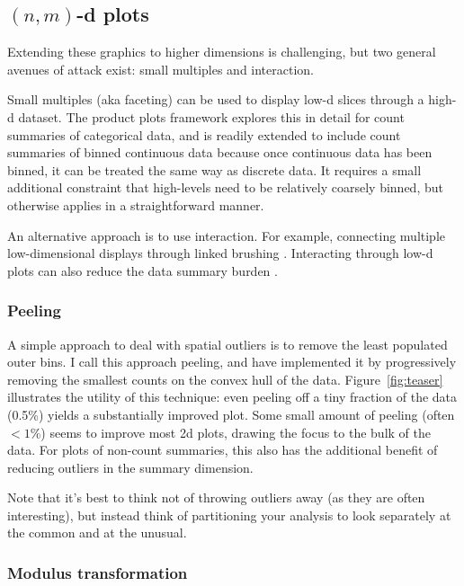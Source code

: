 \documentclass[journal]{vgtc}                %
\begin{document}
\subsection{\texorpdfstring{$(n, m)$}{(n, m)}-d plots}
\label{sub:nd-plots}

Extending these graphics to higher dimensions is challenging, but two general avenues of attack exist: small multiples and interaction.

Small multiples (aka faceting) can be used to display low-d slices through a high-d dataset. The product plots \citep{me:prodplots} framework explores this in detail for count summaries of categorical data, and is readily extended to include count summaries of binned continuous data because once continuous data has been binned, it can be treated the same way as discrete data. It requires a small additional constraint that high-levels need to be relatively coarsely binned, but otherwise applies in a straightforward manner.

An alternative approach is to use interaction. For example, connecting multiple low-dimensional displays through linked brushing \citep{liu:2013,swayne:2003}.  Interacting through low-d plots can also reduce the data summary burden \citep{heer:2012}.

\subsubsection{Peeling}
\label{sub:peeling}

A simple approach to deal with spatial outliers is to remove the least populated outer bins. I call this approach peeling, and have implemented it by progressively removing the smallest counts on the convex hull of the data. Figure~\ref{fig:teaser} illustrates the utility of this technique: even peeling off a tiny fraction of the data (0.5\%) yields a substantially improved plot. Some small amount of peeling (often $< 1\%$) seems to improve most 2d plots, drawing the focus to the bulk of the data. For plots of non-count summaries, this also has the additional benefit of reducing outliers in the summary dimension. 

Note that it's best to think not of throwing outliers away (as they are often interesting), but instead think of partitioning your analysis to look separately at the common and at the unusual.

\subsubsection{Modulus transformation}
\label{sub:mt}
\end{document}
